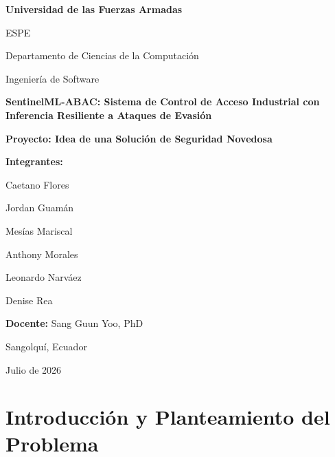 \documentclass[12pt,letterpaper]{article}
\begin{document}
\vspace*{1.65cm}
\noindent\hspace*{4.65cm}
\begin{minipage}{0.66\textwidth}
  \begin{flushleft}
    {\Large\bfseries\color{espeGreen} Universidad de las Fuerzas Armadas\par ESPE\par}
    \vspace{0.25cm}
    {\large Departamento de Ciencias de la Computación\par}
    \vspace{0.2cm}
    {\large Ingeniería de Software\par}
    \vspace{1.0cm}
    {\fontsize{20}{24}\selectfont\bfseries\color{ink} SentinelML-ABAC: Sistema de Control de Acceso Industrial con Inferencia Resiliente a Ataques de Evasión\par}
    \vspace{0.35cm}
    {\Large\color{softGold}\bfseries Proyecto: Idea de una Solución de Seguridad Novedosa\par}
    \vspace{0.8cm}
    \vspace{0.45cm}

    {\bfseries Integrantes:}\par
    Caetano Flores\par
    Jordan Guamán\par
    Mesías Mariscal\par
    Anthony Morales\par
    Leonardo Narváez\par
    Denise Rea\par
    \vspace{0.25cm}
    {\bfseries Docente:} Sang Guun Yoo, PhD\par
    \vspace{0.45cm}
    Sangolquí, Ecuador\par
    Julio de 2026
  \end{flushleft}
\end{minipage}
\clearpage

\tableofcontents
\newpage

\section{Introducción y Planteamiento del Problema}
\end{document}
